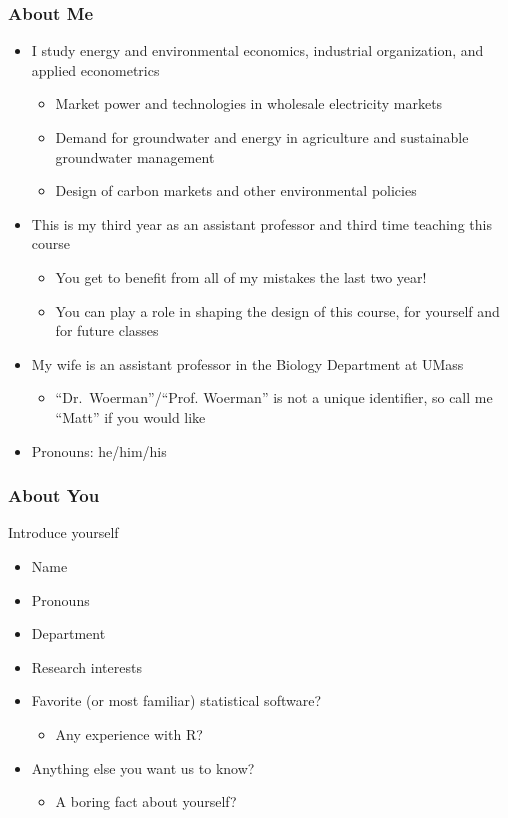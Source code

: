 \documentclass{beamer}
\begin{document}
\begin{frame}\frametitle{About Me}
    \begin{itemize}
        \item I study energy and environmental economics, industrial organization, and applied econometrics
        \begin{itemize}
            \item Market power and technologies in wholesale electricity markets
            \item Demand for groundwater and energy in agriculture and sustainable groundwater management
            \item Design of carbon markets and other environmental policies
        \end{itemize}
        \item This is my third year as an assistant professor and third time teaching this course
        \begin{itemize}
            \item You get to benefit from all of my mistakes the last two year!
            \item You can play a role in shaping the design of this course, for yourself and for future classes
        \end{itemize}
        \item My wife is an assistant professor in the Biology Department at UMass
        \begin{itemize}
            \item ``Dr.\ Woerman''/``Prof. Woerman'' is not a unique identifier, so call me ``Matt'' if you would like
        \end{itemize}
        \item Pronouns: he/him/his
    \end{itemize}
\end{frame}

\begin{frame}\frametitle{About You}
    Introduce yourself
    \begin{itemize}
        \item Name
        \item Pronouns
        \item Department
        \item Research interests
        \item Favorite (or most familiar) statistical software? 
        \begin{itemize}
            \item Any experience with R?
        \end{itemize}
        \item Anything else you want us to know?
        \begin{itemize}
            \item A boring fact about yourself?
        \end{itemize}
    \end{itemize}
\end{frame}
\end{document}
